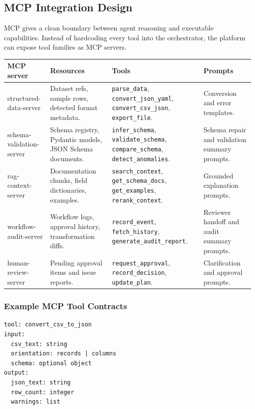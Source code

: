 \subsection{MCP Integration Design}

MCP gives \projectname{} a clean boundary between agent reasoning and executable capabilities. Instead of hardcoding every tool into the orchestrator, the platform can expose tool families as MCP servers.

\begin{longtable}{p{}p{}p{}p{}}
\toprule
\textbf{MCP server} & \textbf{Resources} & \textbf{Tools} & \textbf{Prompts} \\
\midrule
structured-data-server & Dataset refs, sample rows, detected format metadata. & \texttt{parse\_data}, \texttt{convert\_json\_yaml}, \texttt{convert\_csv\_json}, \texttt{export\_file}. & Conversion and error templates. \\
\addlinespace
schema-validation-server & Schema registry, Pydantic models, JSON Schema documents. & \texttt{infer\_schema}, \texttt{validate\_schema}, \texttt{compare\_schema}, \texttt{detect\_anomalies}. & Schema repair and validation summary prompts. \\
\addlinespace
rag-context-server & Documentation chunks, field dictionaries, examples. & \texttt{search\_context}, \texttt{get\_schema\_docs}, \texttt{get\_examples}, \texttt{rerank\_context}. & Grounded explanation prompts. \\
\addlinespace
workflow-audit-server & Workflow logs, approval history, transformation diffs. & \texttt{record\_event}, \texttt{fetch\_history}, \texttt{generate\_audit\_report}. & Reviewer handoff and audit summary prompts. \\
\addlinespace
human-review-server & Pending approval items and issue reports. & \texttt{request\_approval}, \texttt{record\_decision}, \texttt{update\_plan}. & Clarification and approval prompts. \\
\bottomrule
\end{longtable}

\subsubsection{Example MCP Tool Contracts}

\begin{verbatim}
tool: convert_csv_to_json
input:
  csv_text: string
  orientation: records | columns
  schema: optional object
output:
  json_text: string
  row_count: integer
  warnings: list
\end{verbatim}

